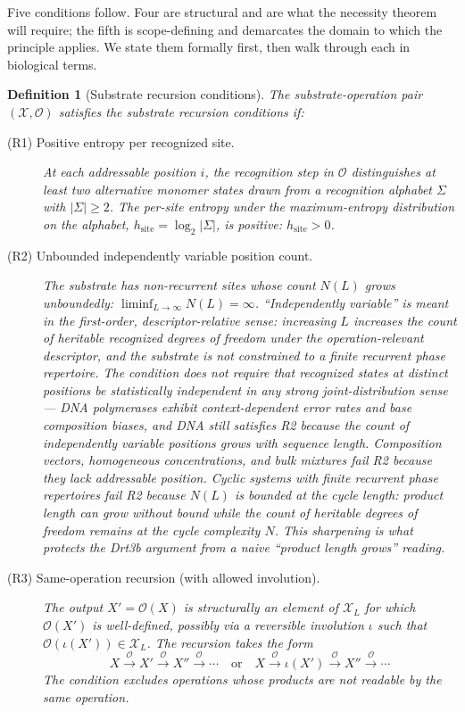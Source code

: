 \documentclass[aps,prx,reprint,amsmath,amssymb,floatfix,superscriptaddress,nofootinbib]{revtex4-2}
\theoremstyle{plain-thm}
\theoremstyle{definition-thm}
\newtheorem{definition}[theorem]{Definition}
\newcommand{\Xset}{\mathcal{X}}
\newcommand{\Op}{\mathcal{O}}
\begin{document}
Five conditions follow. Four are structural and are what the necessity theorem will require; the fifth is scope-defining and demarcates the domain to which the principle applies. We state them formally first, then walk through each in biological terms.

\begin{definition}[Substrate recursion conditions]
\label{def:conditions}
The substrate-operation pair $(\Xset, \Op)$ satisfies the substrate recursion conditions if:

\begin{description}
\item[(R1) Positive entropy per recognized site.] At each addressable position $i$, the recognition step in $\Op$ distinguishes at least two alternative monomer states drawn from a recognition alphabet $\Sigma$ with $|\Sigma| \ge 2$. The per-site entropy under the maximum-entropy distribution on the alphabet, $h_{\mathrm{site}} = \log_2 |\Sigma|$, is positive: $h_{\mathrm{site}} > 0$.

\item[(R2) Unbounded independently variable position count.] The substrate has non-recurrent sites whose count $N(L)$ grows unboundedly: $\liminf_{L \to \infty} N(L) = \infty$. ``Independently variable'' is meant in the first-order, descriptor-relative sense: increasing $L$ increases the count of heritable recognized degrees of freedom under the operation-relevant descriptor, and the substrate is \emph{not constrained to a finite recurrent phase repertoire}. The condition does not require that recognized states at distinct positions be statistically independent in any strong joint-distribution sense --- DNA polymerases exhibit context-dependent error rates and base composition biases, and DNA still satisfies R2 because the count of independently variable positions grows with sequence length. Composition vectors, homogeneous concentrations, and bulk mixtures fail R2 because they lack addressable position. Cyclic systems with finite recurrent phase repertoires fail R2 because $N(L)$ is bounded at the cycle length: product length can grow without bound while the count of heritable degrees of freedom remains at the cycle complexity $N$. This sharpening is what protects the Drt3b argument from a naive ``product length grows'' reading.

\item[(R3) Same-operation recursion (with allowed involution).] The output $X' = \Op(X)$ is structurally an element of $\Xset_L$ for which $\Op(X')$ is well-defined, possibly via a reversible involution $\iota$ such that $\Op(\iota(X')) \in \Xset_L$. The recursion takes the form
\[
X \xrightarrow{\Op} X' \xrightarrow{\Op} X'' \xrightarrow{\Op} \cdots \quad \text{or} \quad X \xrightarrow{\Op} \iota(X') \xrightarrow{\Op} X'' \xrightarrow{\Op} \cdots
\]
The condition excludes operations whose products are not readable by the same operation.


\end{description}
\end{definition}
\end{document}
